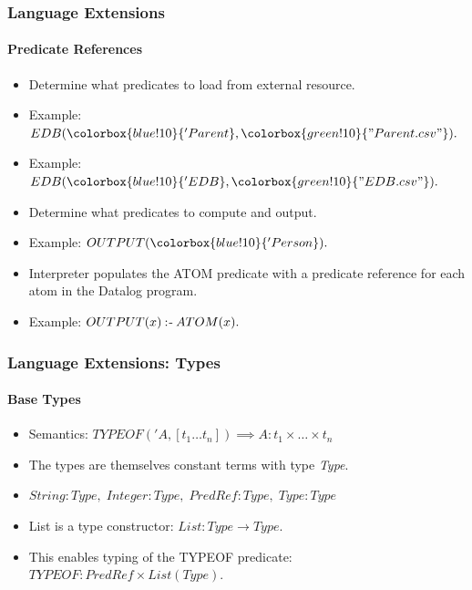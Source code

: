 \documentclass{beamer}
\newcommand{\coloneqtwo}{\mathbin{:\hspace{-0.5ex}\textsf{-}}}
\newcommand{\strconst}[1]{ \colorbox{green!10}{#1} }
\newcommand{\predconst}[1]{ \colorbox{blue!10}{#1} }
\begin{document}
\begin{frame}
\frametitle{Language Extensions}
\framesubtitle{Predicate References}
\begin{itemize}
\item<2->Determine what predicates to load from external resource.
\item<3->Example: $EDB(\predconst{'Parent}, \strconst{"Parent.csv"}).$
\item<4->Example: $EDB(\predconst{'EDB}, \strconst{"EDB.csv"}).$
\end{itemize}

\begin{itemize}
\item<6->Determine what predicates to compute and output. 
\item<7->Example: $OUTPUT(\predconst{'Person}). $
\end{itemize}

\begin{itemize}
\item<9->Interpreter populates the ATOM predicate with a predicate reference for each atom in the Datalog program.
\item<10->Example: $OUTPUT(x) \coloneqtwo ATOM(x).$
\end{itemize}
\end{frame}
\begin{frame}
\frametitle{Language Extensions: Types}
\framesubtitle{Base Types}
\begin{itemize}
\item<2-> Semantics:  $TYPEOF('A, [t_1  \ldots  t_n]) \implies A : t_1 \times \ldots \times t_n$
\item<3-> The types are themselves constant terms with type \textit{Type}.
\item<4-> $String : Type, \; Integer : Type, \; PredRef : Type, \; Type : Type$
\item<5-> List is a type constructor: $List : Type \rightarrow Type$.\\
\item<6-> This enables typing of the TYPEOF predicate: $TYPEOF: PredRef \times List(Type)$.
\end{itemize}
\end{frame}
\end{document}
